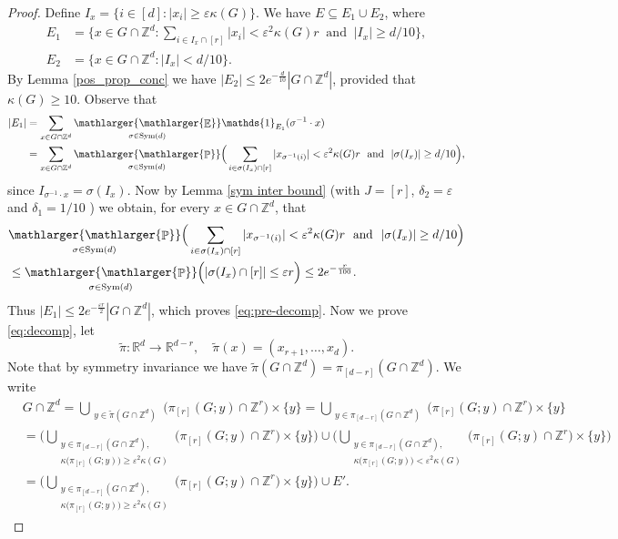 \documentclass[a4paper,oneside, reqno]{amsart}
\numberwithin{equation}{section}
\theoremstyle{definition}%
\theoremstyle{definition}
\theoremstyle{definition}%
\theoremstyle{definition}
\newcommand{\E}{\mathop{\mathbb{E}}}
\newcommand{\Pro}{\mathop{\mathbb{P}}}
\newcommand{\Z}{\mathbb{Z}}
\newcommand{\R}{\mathbb{R}}
\DeclareMathOperator{\Sym}{Sym}
\newcommand{\se}[1]{\underset{_{\substack{#1}}}{\mathlarger{\mathlarger{\E}}}}
\newcommand{\spr}[1]{\underset{_{\substack{#1}}}{\mathlarger{\mathlarger{\Pro}}}}
\begin{document}
\begin{proof}
Define $I_x=\{i\in [d]: |x_i|\ge\varepsilon\kappa(G)\}$. We have
$E\subseteq E_1\cup E_2$, where
\begin{align*}
E_1&=\{x\in G\cap\Z^d\colon \sum_{i\in I_x\cap[r]}|
x_i|<\varepsilon^2\kappa(G)r\ \text{ and }\ |I_x|\ge d/10\},\\
E_2&=\{x\in G\cap\Z^d\colon |I_x|<d/10\}.
\end{align*}
By Lemma \ref{pos_prop_conc} we have $|E_2|\le2e^{-\frac{d}{10}}|G\cap\Z^d|$, provided that $\kappa(G)\ge10$. Observe that
\begin{align*}
|E_1|&=\sum_{x\in G\cap\Z^d}\se{\sigma\in{\rm Sym}(d)}\mathds{1}_{E_1}(\sigma^{-1}\cdot x)\\
&=\sum_{x\in G\cap\Z^d}\spr{\sigma \in \Sym(d)}\Big(
\sum_{i\in \sigma(I_x)\cap [r]}|x_{\sigma^{-1}(i)}|<\varepsilon^2\kappa(G)r\ \text{ and }\ |\sigma(I_x)|\ge d/10\Big),
\end{align*}
since $I_{\sigma^{-1}\cdot x}=\sigma(I_x)$. 
Now by Lemma \ref{sym inter bound} (with $J=[r]$, $\delta_2=\varepsilon$ and $\delta_1=1/10$ ) we obtain, for every $x\in G\cap\Z^d$, that
\begin{align*}
  &\spr{\sigma \in \Sym(d)}\Big(
\sum_{i\in \sigma(I_x)\cap [r]}|x_{\sigma^{-1}(i)}|<\varepsilon^2\kappa(G)r\ \text{ and }\ |\sigma(I_x)|\ge d/10\Big)\\
  &\le
\spr{\sigma \in \Sym(d)}\Big( |\sigma(I_x)\cap [r]|\le \varepsilon r\Big)\le 2e^{-\frac{r}{100}}.
\end{align*}
  Thus $|E_1|\le 2e^{-\frac{\varepsilon r}{2}}|G \cap \Z^d|$, which proves \eqref{eq:pre-decomp}. Now we prove \eqref{eq:decomp}, let 
  \[
  \widetilde{\pi}: \R^d \to \R^{d-r}, \quad \widetilde{\pi}(x)=(x_{r+1},\ldots,x_{d}).
  \]
  Note that by symmetry invariance we have $\widetilde{\pi}(G \cap \Z^d)=\pi_{[d-r]}(G \cap \Z^d)$.
  We write
  \begin{align*}
&G\cap\Z^d=\bigcup_{\substack{y \in \widetilde{\pi}(G \cap \Z^d)}}\Big(\pi_{[r]}(G;y) \cap \Z^r \Big) \times  \{y\} = \bigcup_{\substack{y \in \pi_{[d-r]}(G \cap \Z^d)}}\Big(\pi_{[r]}(G;y) \cap \Z^r \Big) \times  \{y\}   \\
&=\Bigg(\bigcup_{\substack{y \in \pi_{[d-r]}(G \cap \Z^d), \\\kappa\big(\pi_{[r]}(G;y)\big) \ge \varepsilon^2 \kappa(G)}}\Big(\pi_{[r]}(G;y) \cap \Z^r \Big) \times  \{y\} \Bigg) \cup \Bigg(\bigcup_{\substack{y \in \pi_{[d-r]}(G \cap \Z^d), \\\kappa\big(\pi_{[r]}(G;y)\big) < \varepsilon^2 \kappa(G)}}\Big(\pi_{[r]}(G;y) \cap \Z^r \Big) \times  \{y\} \Bigg) \\
&=\Bigg(\bigcup_{\substack{y \in \pi_{[d-r]}(G \cap \Z^d), \\\kappa\big(\pi_{[r]}(G;y)\big) \ge \varepsilon^2 \kappa(G)}}\Big(\pi_{[r]}(G;y) \cap \Z^r \Big) \times  \{y\} \Bigg)   \cup E'.
   \end{align*}                
\end{proof}
\end{document}
